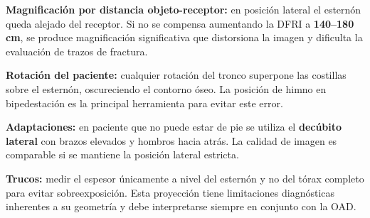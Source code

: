 	\textbf{Magnificación por distancia objeto-receptor:} en posición lateral el esternón queda alejado del receptor. Si no se compensa aumentando la DFRI a \textbf{140--180 cm}, se produce magnificación significativa que distorsiona la imagen y dificulta la evaluación de trazos de fractura.
	
	\textbf{Rotación del paciente:} cualquier rotación del tronco superpone las costillas sobre el esternón, oscureciendo el contorno óseo. La posición de himno en bipedestación es la principal herramienta para evitar este error.
	
	\textbf{Adaptaciones:} en paciente que no puede estar de pie se utiliza el \textbf{decúbito lateral} con brazos elevados y hombros hacia atrás. La calidad de imagen es comparable si se mantiene la posición lateral estricta.
	
	\textbf{Trucos:} medir el espesor únicamente a nivel del esternón y no del tórax completo para evitar sobreexposición. Esta proyección tiene limitaciones diagnósticas inherentes a su geometría y debe interpretarse siempre en conjunto con la OAD.
	
